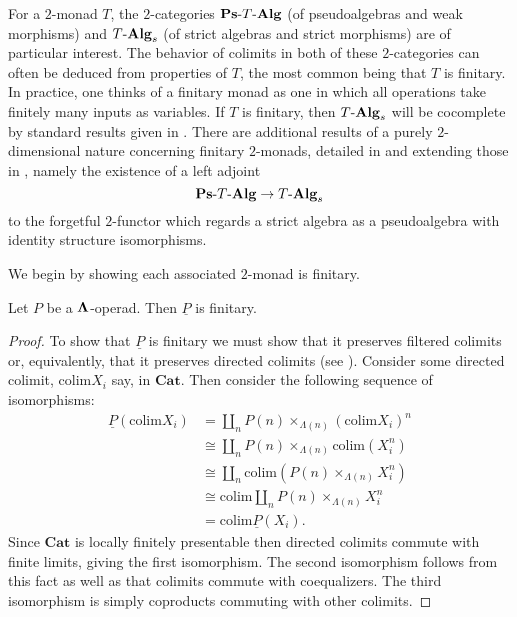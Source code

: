  For a $2$-monad $T$, the $2$-categories $\mathbf{Ps}\mbox{-}T\mbox{-}\mathbf{Alg}$ (of pseudoalgebras and weak morphisms) and $T\mbox{-}\mathbf{Alg}_s$ (of strict algebras and strict morphisms) are of particular interest. The behavior of colimits in both of these $2$-categories can often be deduced from properties of $T$, the most common being that $T$ is finitary. In practice, one thinks of a finitary monad as one in which all operations take finitely many inputs as variables. If $T$ is finitary, then $T\mbox{-}\mathbf{Alg}_s$ will be cocomplete by standard results given in \cite{BKP}. There are additional results of a purely $2$-dimensional nature concerning finitary $2$-monads, detailed in \cite{lack-cod} and extending those in \cite{BKP}, namely the existence of a left adjoint
    \[
        \mathbf{Ps}\mbox{-}T\mbox{-}\mathbf{Alg} \rightarrow T\mbox{-}\mathbf{Alg}_s
    \]
to the forgetful $2$-functor which regards a strict algebra as a pseudoalgebra with identity structure isomorphisms.

We begin by showing each associated $2$-monad is finitary.
\begin{prop}
Let $P$ be a $\mathbf{\Lambda}$-operad. Then $\underline{P}$ is finitary.
\end{prop}
\begin{proof}
To show that $\underline{P}$ is finitary we must show that it preserves filtered colimits or, equivalently, that it preserves directed colimits (see \cite{ar}). Consider some directed colimit, $\text{colim}X_{i}$ say, in $\mathbf{Cat}$. Then consider the following sequence of isomorphisms:
    \begin{align*}
      \underline{P}(\text{colim}X_{i}) &= \coprod_n P(n) \times_{\Lambda(n)} (\text{colim}X_{i})^n \\
      &\cong \coprod_n P(n) \times_{\Lambda(n)} \text{colim}(X_{i}^n) \\
      &\cong \coprod_n \text{colim}(P(n) \times_{\Lambda(n)} X_{i}^n) \\
      &\cong \text{colim}\coprod_n P(n) \times_{\Lambda(n)} X_{i}^n \\
      &= \text{colim}\underline{P}(X_{i}).
    \end{align*}
Since $\mathbf{Cat}$ is locally finitely presentable then directed colimits commute with finite limits, giving the first isomorphism. The second isomorphism follows from this fact as well as that colimits commute with coequalizers. The third isomorphism is simply coproducts commuting with other colimits.
\end{proof}

